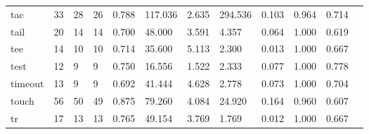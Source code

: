 \begin{longtable}{lp{1.00cm}p{1.00cm}p{1.00cm}p{1.00cm}p{1.00cm}p{1.00cm}p{1.00cm}p{1.00cm}p{1.00cm}p{1.00cm}p{1.00cm}}
tac       &                           33 &                 28 &                                26 &                                      0.788 &                                117.036 &                                        2.635 &                           294.536 &                                   0.103 &                        0.964 &                                        0.714 \\
tail      &                           20 &                 14 &                                14 &                                      0.700 &                                 48.000 &                                        3.591 &                             4.357 &                                   0.064 &                        1.000 &                                        0.619 \\
tee       &                           14 &                 10 &                                10 &                                      0.714 &                                 35.600 &                                        5.113 &                             2.300 &                                   0.013 &                        1.000 &                                        0.667 \\
test      &                           12 &                  9 &                                 9 &                                      0.750 &                                 16.556 &                                        1.522 &                             2.333 &                                   0.077 &                        1.000 &                                        0.778 \\
timeout   &                           13 &                  9 &                                 9 &                                      0.692 &                                 41.444 &                                        4.628 &                             2.778 &                                   0.073 &                        1.000 &                                        0.704 \\
touch     &                           56 &                 50 &                                49 &                                      0.875 &                                 79.260 &                                        4.084 &                            24.920 &                                   0.164 &                        0.960 &                                        0.607 \\
tr        &                           17 &                 13 &                                13 &                                      0.765 &                                 49.154 &                                        3.769 &                             1.769 &                                   0.012 &                        1.000 &                                        0.667 \\

\end{longtable}
